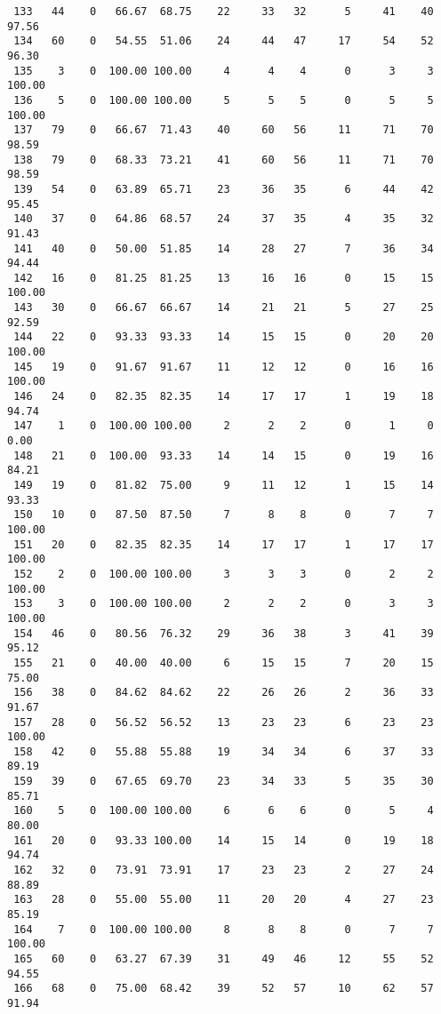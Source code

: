 \begin{verbatim}
 133   44    0   66.67  68.75    22     33   32      5     41    40    97.56
 134   60    0   54.55  51.06    24     44   47     17     54    52    96.30
 135    3    0  100.00 100.00     4      4    4      0      3     3   100.00
 136    5    0  100.00 100.00     5      5    5      0      5     5   100.00
 137   79    0   66.67  71.43    40     60   56     11     71    70    98.59
 138   79    0   68.33  73.21    41     60   56     11     71    70    98.59
 139   54    0   63.89  65.71    23     36   35      6     44    42    95.45
 140   37    0   64.86  68.57    24     37   35      4     35    32    91.43
 141   40    0   50.00  51.85    14     28   27      7     36    34    94.44
 142   16    0   81.25  81.25    13     16   16      0     15    15   100.00
 143   30    0   66.67  66.67    14     21   21      5     27    25    92.59
 144   22    0   93.33  93.33    14     15   15      0     20    20   100.00
 145   19    0   91.67  91.67    11     12   12      0     16    16   100.00
 146   24    0   82.35  82.35    14     17   17      1     19    18    94.74
 147    1    0  100.00 100.00     2      2    2      0      1     0     0.00
 148   21    0  100.00  93.33    14     14   15      0     19    16    84.21
 149   19    0   81.82  75.00     9     11   12      1     15    14    93.33
 150   10    0   87.50  87.50     7      8    8      0      7     7   100.00
 151   20    0   82.35  82.35    14     17   17      1     17    17   100.00
 152    2    0  100.00 100.00     3      3    3      0      2     2   100.00
 153    3    0  100.00 100.00     2      2    2      0      3     3   100.00
 154   46    0   80.56  76.32    29     36   38      3     41    39    95.12
 155   21    0   40.00  40.00     6     15   15      7     20    15    75.00
 156   38    0   84.62  84.62    22     26   26      2     36    33    91.67
 157   28    0   56.52  56.52    13     23   23      6     23    23   100.00
 158   42    0   55.88  55.88    19     34   34      6     37    33    89.19
 159   39    0   67.65  69.70    23     34   33      5     35    30    85.71
 160    5    0  100.00 100.00     6      6    6      0      5     4    80.00
 161   20    0   93.33 100.00    14     15   14      0     19    18    94.74
 162   32    0   73.91  73.91    17     23   23      2     27    24    88.89
 163   28    0   55.00  55.00    11     20   20      4     27    23    85.19
 164    7    0  100.00 100.00     8      8    8      0      7     7   100.00
 165   60    0   63.27  67.39    31     49   46     12     55    52    94.55
 166   68    0   75.00  68.42    39     52   57     10     62    57    91.94

\end{verbatim}
